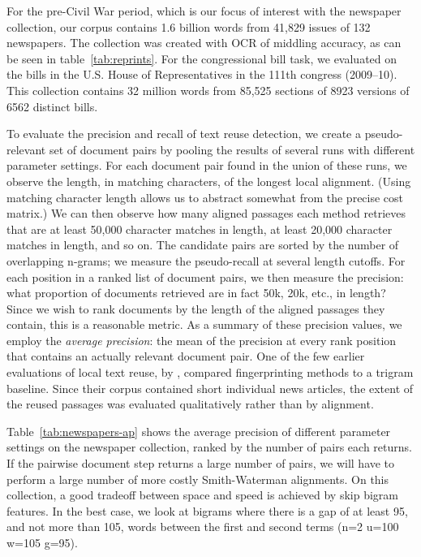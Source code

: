 \documentclass[pdftex,11pt]{article}
\begin{document}
For the pre-Civil War period, which is our focus of interest with the
newspaper collection, our corpus contains 1.6 billion words from
41,829 issues of 132 newspapers.  The collection was created with OCR
of middling accuracy, as can be seen in table~\ref{tab:reprints}.  For
the congressional bill task, we evaluated on the bills in the
U.S. House of Representatives in the 111th congress (2009--10).  This
collection contains 32 million words from 85,525 sections of 8923
versions of 6562 distinct bills.

To evaluate the precision and recall of text reuse detection, we
create a pseudo-relevant set of document pairs by pooling the results
of several runs with different parameter settings.  For each document
pair found in the union of these runs, we observe the length, in
matching characters, of the longest local alignment.  (Using matching
character length allows us to abstract somewhat from the precise cost
matrix.)  We can then observe how many aligned passages each method
retrieves that are at least 50,000 character matches in length, at
least 20,000 character matches in length, and so on.  The candidate
pairs are sorted by the number of overlapping n-grams; we measure the
pseudo-recall at several length cutoffs.  For each position in a
ranked list of document pairs, we then measure the precision: what
proportion of documents retrieved are in fact 50k, 20k, etc., in
length?  Since we wish to rank documents by the length of the aligned
passages they contain, this is a reasonable metric.  As a summary of
these precision values, we employ the \emph{average precision}: the
mean of the precision at every rank position that contains an actually
relevant document pair.  One of the few earlier evaluations of local
text reuse, by \citet{seo08:_local_text_reuse_detec}, compared
fingerprinting methods to a trigram baseline.  Since their corpus
contained short individual news articles, the extent of the reused
passages was evaluated qualitatively rather than by alignment.

Table~\ref{tab:newspapers-ap} shows the average precision of different
parameter settings on the newspaper collection, ranked by the number
of pairs each returns.  If the pairwise document step returns a large
number of pairs, we will have to perform a large number of more costly
Smith-Waterman alignments.  On this collection, a good tradeoff
between space and speed is achieved by skip bigram features.  In the
best case, we look at bigrams where there is a gap of at least 95, and
not more than 105, words between the first and second terms (n=2
u=100 w=105 g=95).
\end{document}
